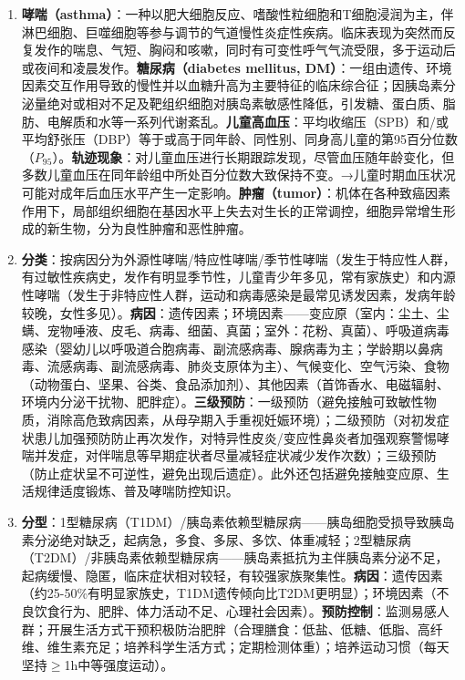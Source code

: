 \begin{enumerate}[leftmargin=*, itemsep=5pt]
    \item \textbf{哮喘（asthma）}：一种以肥大细胞反应、嗜酸性粒细胞和T细胞浸润为主，伴淋巴细胞、巨噬细胞等参与调节的气道慢性炎症性疾病。临床表现为突然而反复发作的喘息、气短、胸闷和咳嗽，同时有可变性呼气气流受限，多于运动后或夜间和凌晨发作。\textbf{糖尿病（diabetes mellitus, DM）}：一组由遗传、环境因素交互作用导致的慢性并以血糖升高为主要特征的临床综合征；因胰岛素分泌量绝对或相对不足及靶组织细胞对胰岛素敏感性降低，引发糖、蛋白质、脂肪、电解质和水等一系列代谢紊乱。\textbf{儿童高血压}：平均收缩压（SPB）和/或平均舒张压（DBP）等于或高于同年龄、同性别、同身高儿童的第95百分位数（$P_{95}$）。\textbf{轨迹现象}：对儿童血压进行长期跟踪发现，尽管血压随年龄变化，但多数儿童血压在同年龄组中所处百分位数大致保持不变。→儿童时期血压状况可能对成年后血压水平产生一定影响。\textbf{肿瘤（tumor）}：机体在各种致癌因素作用下，局部组织细胞在基因水平上失去对生长的正常调控，细胞异常增生形成的新生物，分为良性肿瘤和恶性肿瘤。

    \item \textbf{分类}：按病因分为外源性哮喘/特应性哮喘/季节性哮喘（发生于特应性人群，有过敏性疾病史，发作有明显季节性，儿童青少年多见，常有家族史）和内源性哮喘（发生于非特应性人群，运动和病毒感染是最常见诱发因素，发病年龄较晚，女性多见）。\textbf{病因}：遗传因素；环境因素——变应原（室内：尘土、尘螨、宠物唾液、皮毛、病毒、细菌、真菌；室外：花粉、真菌）、呼吸道病毒感染（婴幼儿以呼吸道合胞病毒、副流感病毒、腺病毒为主；学龄期以鼻病毒、流感病毒、副流感病毒、肺炎支原体为主）、气候变化、空气污染、食物（动物蛋白、坚果、谷类、食品添加剂）、其他因素（首饰香水、电磁辐射、环境内分泌干扰物、肥胖症）。\textbf{三级预防}：一级预防（避免接触可致敏性物质，消除高危致病因素，从母孕期入手重视妊娠环境）；二级预防（对初发症状患儿加强预防防止再次发作，对特异性皮炎/变应性鼻炎者加强观察警惕哮喘并发症，对伴喘息等早期症状者尽量减轻症状减少发作次数）；三级预防（防止症状呈不可逆性，避免出现后遗症）。此外还包括避免接触变应原、生活规律适度锻炼、普及哮喘防控知识。

    \item \textbf{分型}：1型糖尿病（T1DM）/胰岛素依赖型糖尿病——胰岛细胞受损导致胰岛素分泌绝对缺乏，起病急，多食、多尿、多饮、体重减轻；2型糖尿病（T2DM）/非胰岛素依赖型糖尿病——胰岛素抵抗为主伴胰岛素分泌不足，起病缓慢、隐匿，临床症状相对较轻，有较强家族聚集性。\textbf{病因}：遗传因素（约25-50\%有明显家族史，T1DM遗传倾向比T2DM更明显）；环境因素（不良饮食行为、肥胖、体力活动不足、心理社会因素）。\textbf{预防控制}：监测易感人群；开展生活方式干预积极防治肥胖（合理膳食：低盐、低糖、低脂、高纤维、维生素充足；培养科学生活方式；定期检测体重）；培养运动习惯（每天坚持$\geq$1h中等强度运动）。


\end{enumerate}
